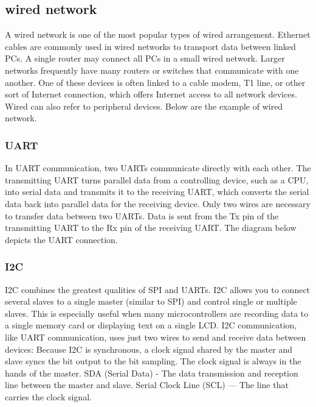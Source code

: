 \subsection{wired network}
A wired network is one of the most popular types of wired arrangement. Ethernet cables are commonly used in wired networks to transport data between linked PCs. A single router may connect all PCs in a small wired network. Larger networks frequently have many routers or switches that communicate with one another. One of these devices is often linked to a cable modem, T1 line, or other sort of Internet connection, which offers Internet access to all network devices. Wired can also refer to peripheral devices. Below are the example of wired network.

\subsubsection{UART}
In UART communication, two UARTs communicate directly with each other. The transmitting UART turns parallel data from a controlling device, such as a CPU, into serial data and transmits it to the receiving UART, which converts the serial data back into parallel data for the receiving device. Only two wires are necessary to transfer data between two UARTs. Data is sent from the Tx pin of the transmitting UART to the Rx pin of the receiving UART. The diagram below depicts the UART connection. \cite{b4}
\subsubsection{I2C}
I2C combines the greatest qualities of SPI and UARTs. I2C allows you to connect several slaves to a single master (similar to SPI) and control single or multiple slaves. This is especially useful when many microcontrollers are recording data to a single memory card or displaying text on a single LCD. I2C communication, like UART communication, uses just two wires to send and receive data between devices: Because I2C is synchronous, a clock signal shared by the master and slave syncs the bit output to the bit sampling. The clock signal is always in the hands of the master. SDA (Serial Data) - The data transmission and reception line between the master and slave. Serial Clock Line (SCL) — The line that carries the clock signal.\cite{b4}

